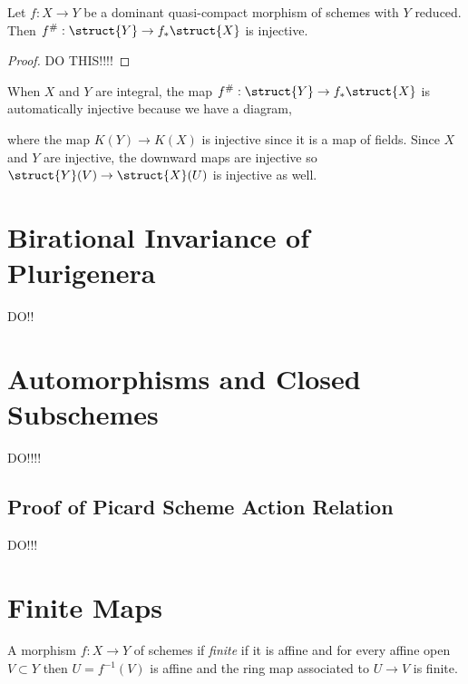\documentclass[12pt]{article}
\begin{document}
\begin{lemma}
Let $f : X \to Y$ be a dominant quasi-compact morphism of schemes with $Y$ reduced. Then $f^{\#} : \struct{Y} \to f_* \struct{X}$ is injective.
\end{lemma}

\begin{proof}
DO THIS!!!!
\end{proof}

\begin{rmk}
When $X$ and $Y$ are integral, the map $f^{\#} : \struct{Y} \to f_* \struct{X}$ is automatically injective because we have a diagram,
\begin{center}
\end{center}
where the map $K(Y) \to K(X)$ is injective since it is a map of fields. Since $X$ and $Y$ are injective, the downward maps are injective so $\struct{Y}(V) \to \struct{X}(U)$ is injective as well.
\end{rmk}

\begin{prop}

\end{prop}

\section{Birational Invariance of Plurigenera}

\begin{prop}
DO!!
\end{prop}

\section{Automorphisms and Closed Subschemes}
DO!!!!
\subsection{Proof of Picard Scheme Action Relation}

DO!!!

\section{Finite Maps}

\begin{defn}
A morphism $f : X \to Y$ of schemes if \textit{finite} if it is affine and for every affine open $V \subset Y$ then $U = f^{-1}(V)$ is affine and the ring map associated to $U \to V$ is finite. 
\end{defn}
\end{document}
